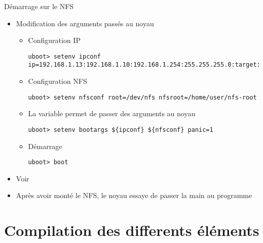 \begin{frame}[fragile=singleslide]{Démarrage sur le NFS}
  \begin{itemize}
  \item Modification des arguments passés au noyau
    \begin{itemize}
    \item Configuration IP
      \begin{lstlisting}
uboot> setenv ipconf ip=192.168.1.13:192.168.1.10:192.168.1.254:255.255.255.0:target:eth0:off
      \end{lstlisting}
    \item Configuration NFS
      \begin{lstlisting}
uboot> setenv nfsconf root=/dev/nfs nfsroot=/home/user/nfs-root
      \end{lstlisting}
    \item La variable  permet de passer des arguments au noyau
      \begin{lstlisting}
uboot> setenv bootargs ${ipconf} ${nfsconf} panic=1
      \end{lstlisting}
    \item Démarrage
      \begin{lstlisting}
uboot> boot
      \end{lstlisting}
    \end{itemize}
  \item Voir 
  \item Après avoir monté le NFS, le noyau essaye de passer la main au
    programme 
  \end{itemize}
\end{frame}

\section{Compilation des differents éléments}


